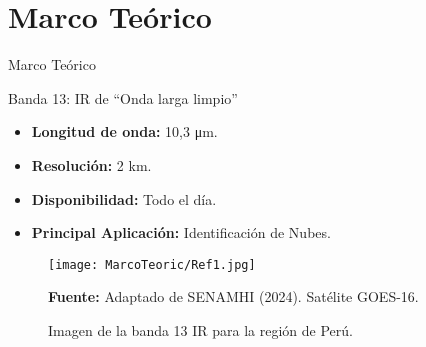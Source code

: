 \documentclass[aspectratio=169,xcolor=dvipsnames]{beamer}
\begin{document}
\section{Marco Teórico}
\begin{frame}{Marco Teórico}
    \begin{block}{\small Banda 13: IR de “Onda larga limpio”} %
        {\tiny %
        \begin{itemize}
            \item \textbf{Longitud de onda:} 10,3 μm.
            \item \textbf{Resolución:} 2 km.
            \item \textbf{Disponibilidad:} Todo el día.
            \item \textbf{Principal Aplicación:} Identificación de Nubes.
        \end{itemize}
        }
    \end{block}

    \begin{figure}
    \centering
    \texttt{[image: MarcoTeoric/Ref1.jpg]} %
    \caption{Imagen de la banda 13 IR para la región de Perú.}
    \vspace{-7pt}
    {\tiny
        \textbf{Fuente:} Adaptado de SENAMHI (2024). Satélite GOES-16. 
    }
    \end{figure}
\end{frame}
\end{document}
